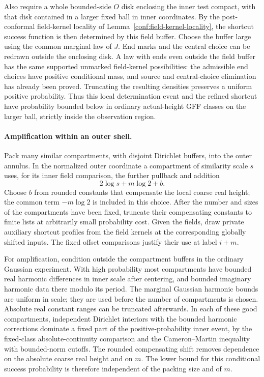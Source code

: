 Also require a whole bounded-side $O$ disk enclosing the inner test compact,
with that disk contained in a larger fixed ball in inner coordinates. By
the post-conformal field-kernel locality of
Lemma~\ref{conf:field-kernel-locality},
the shortcut success function is then determined by this field buffer.
Choose the buffer large using the common marginal law of $J$. End marks
and the central choice can be redrawn outside the enclosing disk. A law
with ends even outside the field buffer has the same supported unmarked
field-kernel possibilities: the admissible end choices have positive
conditional mass, and source and central-choice elimination has already
been proved. Truncating the resulting densities preserves a uniform
positive probability. Thus this local determination event and the refined
shortcut have probability bounded below in ordinary actual-height GFF
classes on the larger ball, strictly inside the observation region.

\paragraph{Amplification within an outer shell.}
Pack many similar compartments, with disjoint Dirichlet buffers, into the
outer annulus. In the normalized outer coordinate a compartment of
similarity scale $s$ uses, for its inner field comparison, the further
pullback and addition
\[
 2\log s+m\log2+b.
\]
Choose $b$ from rounded constants that compensate the local coarse real
height; the common term $-m\log2$ is included in this choice. After the
number and sizes of the compartments have been fixed, truncate their
compensating constants to finite lists at arbitrarily small probability
cost. Given the fields, draw private auxiliary shortcut profiles from the
field kernels at the corresponding globally shifted inputs. The fixed
offset comparisons justify their use at label $i+m$.

For amplification, condition outside the compartment buffers in the
ordinary Gaussian experiment. With high probability most compartments
have bounded real harmonic differences in inner scale after centering,
and bounded imaginary harmonic data there modulo its period. The marginal
Gaussian harmonic bounds are uniform in scale; they are used before the
number of compartments is chosen. Absolute real constant ranges can be
truncated afterwards. In each of these good compartments, independent
Dirichlet interiors with the bounded harmonic corrections dominate a
fixed part of the positive-probability inner event, by the fixed-class
absolute-continuity comparison and the Cameron--Martin inequality with
bounded-norm cutoffs. The rounded compensating shift removes dependence
on the absolute coarse real height and on $m$. The lower bound for this
conditional success probability is therefore independent of the packing
size and of $m$.

